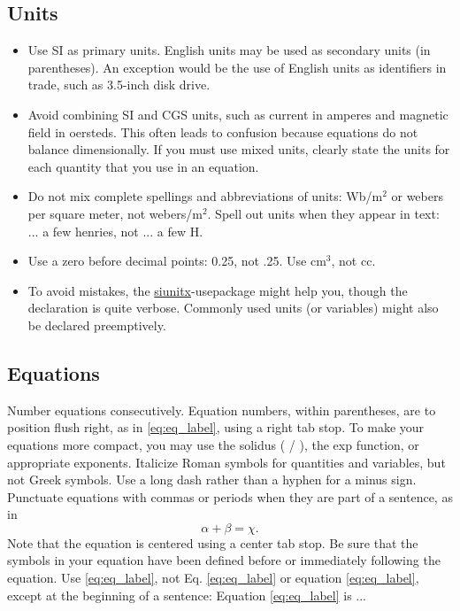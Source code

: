 \documentclass[11pt]{report}
\numberwithin{equation}{chapter}		%
\numberwithin{figure}{chapter}			%
\numberwithin{table}{chapter}			%
\begin{document}
\subsection{Units}

\begin{itemize}
\item Use SI as primary units. English units may be used as secondary units (in parentheses). An exception would be the use of English units as identifiers in trade, such as 3.5-inch disk drive.
\item Avoid combining SI and CGS units, such as current in amperes and magnetic field in oersteds. This often leads to confusion because equations do not balance dimensionally. If you must use mixed units, clearly state the units for each quantity that you use in an equation.
\item Do not mix complete spellings and abbreviations of units: Wb/m$^2$ or webers per square meter, not webers/m$^2$.  Spell out units when they appear in text: ... a few henries, not ... a few H.
\item Use a zero before decimal points: 0.25, not .25. Use cm$^3$, not cc. 
\item To avoid mistakes, the \href{http://mirrors.ibiblio.org/CTAN/macros/latex/contrib/siunitx/siunitx.pdf}{siunitx}-usepackage might help you, though the declaration is quite verbose. Commonly used units (or variables) might also be declared preemptively. 
\end{itemize}

\subsection{Equations}
Number equations consecutively. Equation numbers, within parentheses, are to position flush right, as in \eqref{eq:eq_label}, using a right tab stop. To make your equations more compact, you may use the solidus ( / ), the exp function, or appropriate exponents. Italicize Roman symbols for quantities and variables, but not Greek symbols. Use a long dash rather than a hyphen for a minus sign. Punctuate equations with commas or periods when they are part of a sentence, as in
\begin{equation}\label{eq:eq_label}
    \alpha + \beta = \chi.
\end{equation}
Note that the equation is centered using a center tab stop. Be sure that the symbols in your equation have been defined before or immediately following the equation. Use \eqref{eq:eq_label}, not Eq. \eqref{eq:eq_label} or equation \eqref{eq:eq_label}, except at the beginning of a sentence: Equation \eqref{eq:eq_label} is ...
\end{document}
